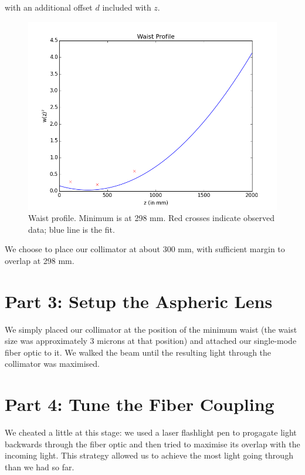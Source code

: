 \documentclass[10pt,a4paper]{article}
\begin{document}
\begin{itemize}
with an additional offset $d$ included with $z$.
\begin{figure}[H]
\centering
\includegraphics[scale=0.5]{../Analysis/waist_profile.png} 
\caption{Waist profile. Minimum is at 298 mm. Red crosses indicate observed data; blue line is the fit.}
\end{figure}
\end{itemize}
We choose to  place our collimator at about 300 mm, with sufficient margin to overlap at 298 mm. 
\section*{Part 3: Setup the Aspheric Lens}
We simply placed our collimator at the position of the minimum waist (the waist size was approximately 3 microns at that position) and attached our single-mode fiber optic to it. We walked the beam until the resulting light through the collimator was maximised.

\section*{Part 4: Tune the Fiber Coupling}
We cheated a little at this stage: we used a laser flashlight pen to progagate light backwards through the fiber optic and then tried to maximise its overlap with the incoming light. This strategy allowed us to achieve the most light going through than we had so far. 
\end{document}
